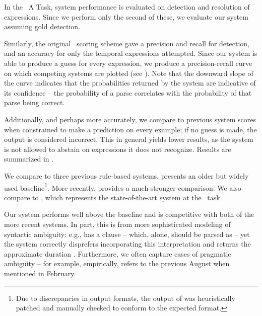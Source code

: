 In the \tempeval\ A Task, system performance is evaluated on 
	detection and resolution of expressions.
Since we perform only the second of these, we evaluate our system
	assuming gold detection.


Similarly, the original \tempeval\ scoring scheme gave a precision 
	and recall for detection, and an accuracy for only the temporal expressions 
	attempted.
Since our system is able to produce a guess for every expression, we produce
	a precision-recall curve on which competing systems are plotted
	(see ).
Note that the downward slope of the curve indicates that the probabilities
	returned by the system are indicative of its confidence -- the probability
	of a parse correlates with the probability of that parse being correct.

Additionally, and perhaps more accurately, we compare to 
	previous system scores when constrained to make a prediction on every
	example; if no guess is made, the output is considered incorrect.
This in general yields lower results, as the system is not allowed to
	abstain on expressions it does not recognize.
Results are summarized in .

We compare to three previous rule-based systems.
 \cite{key:2000mani-temporal} presents an older but widely
	used baseline\footnote{
		Due to discrepancies in output formats, 
			the output of  was heuristically patched
			and manually checked to conform to the expected format.
	}.
More recently,  \cite{key:2012chang-temporal} 
	provides a much stronger comparison.
We also compare to  \cite{key:2010strotgen-temporal}, 
	which represents the state-of-the-art system at the \tempeval\ task.

Our system performs well above the  baseline and is competitive
	with both of the more recent systems.
In part, this is from more sophisticated modeling of syntactic ambiguity:
	e.g.,  has a clause  -- which, alone,
	should be parsed as  -- yet the system correctly disprefers
	incorporating this interpretation and 
	returns the approximate duration .
Furthermore, we often capture cases of pragmatic ambiguity -- for example,
	empirically,  refers to the previous August when mentioned in
	February.



